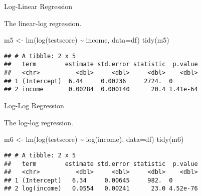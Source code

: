 \documentclass[
  10pt,
  ignorenonframetext,
  t, svgnames, handout]{beamer}
\newenvironment{Shaded}{\begin{snugshade}}{\end{snugshade}}
\newcommand{\AttributeTok}[1]{\textcolor[rgb]{0.77,0.63,0.00}{#1}}
\newcommand{\FunctionTok}[1]{\textcolor[rgb]{0.00,0.00,0.00}{#1}}
\newcommand{\NormalTok}[1]{#1}
\newcommand{\OtherTok}[1]{\textcolor[rgb]{0.56,0.35,0.01}{#1}}
\newcommand{\SpecialCharTok}[1]{\textcolor[rgb]{0.00,0.00,0.00}{#1}}
\begin{document}
\begin{frame}[fragile]{Log-Linear Regression}
\protect\hypertarget{log-linear-regression}{}
\begin{block}{The linear-log regression.}
\protect\hypertarget{the-linear-log-regression.-1}{}
\scriptsize

\begin{Shaded}
\begin{Highlighting}[]
\NormalTok{m5 }\OtherTok{\textless{}{-}} \FunctionTok{lm}\NormalTok{(}\FunctionTok{log}\NormalTok{(testscore) }\SpecialCharTok{\textasciitilde{}}\NormalTok{ income, }\AttributeTok{data=}\NormalTok{df)}
\FunctionTok{tidy}\NormalTok{(m5)}
\end{Highlighting}
\end{Shaded}

\begin{verbatim}
## # A tibble: 2 x 5
##   term        estimate std.error statistic  p.value
##   <chr>          <dbl>     <dbl>     <dbl>    <dbl>
## 1 (Intercept)  6.44     0.00236     2724.  0       
## 2 income       0.00284  0.000140      20.4 1.41e-64
\end{verbatim}

\normalsize
\end{block}
\end{frame}

\begin{frame}[fragile]{Log-Log Regression}
\protect\hypertarget{log-log-regression}{}
\begin{block}{The log-log regression.}
\protect\hypertarget{the-log-log-regression.}{}
\scriptsize

\begin{Shaded}
\begin{Highlighting}[]
\NormalTok{m6 }\OtherTok{\textless{}{-}} \FunctionTok{lm}\NormalTok{(}\FunctionTok{log}\NormalTok{(testscore) }\SpecialCharTok{\textasciitilde{}} \FunctionTok{log}\NormalTok{(income), }\AttributeTok{data=}\NormalTok{df)}
\FunctionTok{tidy}\NormalTok{(m6)}
\end{Highlighting}
\end{Shaded}

\begin{verbatim}
## # A tibble: 2 x 5
##   term        estimate std.error statistic  p.value
##   <chr>          <dbl>     <dbl>     <dbl>    <dbl>
## 1 (Intercept)   6.34     0.00645     982.  0       
## 2 log(income)   0.0554   0.00241      23.0 4.52e-76
\end{verbatim}

\normalsize
\end{block}
\end{frame}
\end{document}
